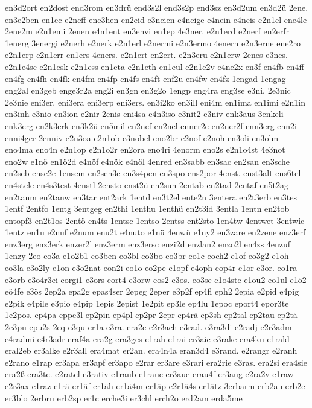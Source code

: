 {en3d2ort
en2dost
end3rom
en3drü
end3s2l
end3s2p
end3sz
en3d2um
en3d2ü
2ene.
en3e2ben
en1ec
e2neff
ene3hen
en2eid
e3neien
e4neige
e4nein
e4neis
e2n1el
ene4le
2ene2m
e2n1emi
2enen
e4n1ent
en3envi
en1ep
4e3ner.
e2n1erd
e2nerf
en2erfr
1energ
3energi
e2nerh
e2nerk
e2n1erl
e2nermi
e2n3ermo
4enern
e2n3erne
ene2ro
e2n1erp
e2n1err
en1ers
4eners.
e2n1ert
en2ert.
e2n3eru
e2n1erw
2enes
e3nes.
e2n1e4sc
e2n1esk
e2n1ess
en1eta
e2n1eth
en1eul
e2n1e2v
e4ne2x
en3f
en4fb
en4ff
en4fg
en4fh
en4fk
en4fm
en4fp
en4fs
en4ft
enf2u
en4fw
en4fz
1engad
1engag
eng2al
en3geb
enge3r2a
eng2i
en3gn
en3g2o
1engp
eng4ra
eng3se
e3ni.
2e3nic
2e3nie
eni3er.
eni3era
eni3erp
eni3ers.
en3i2ko
en3ill
eni4m
en1ima
en1imi
e2n1in
en3inh
e3nio
en3ion
e2nir
2enis
eni4sa
e4n3iso
e3nit2
e3niv
enk3aus
3enkeli
enk3erg
en2k3erk
en3k2ü
en5mil
en2nef
en2nel
enner2e
en2ner2f
enn3erg
enn2i
enni4ger
2enniv
e2n3oa
e2n1ob
e3nobel
eno2br
e2nof
e2noh
en3oli
en3olm
eno4ma
eno4n
e2n1op
e2n1o2r
en2ora
eno4ri
4enorm
eno2s
e2n1o4st
4e3not
eno2w
e1nö
en1ö2d
e4nöf
e4nök
e4nöl
4enred
en3sabb
en3sac
en2san
en3sche
en2seb
ense2e
1ensem
en2sen3e
en3s4pen
en3spo
ens2por
4enst.
enst3alt
ens6tel
en4stele
en4s3test
4enstl
2ensto
enst2ü
en2sun
2entab
en2tad
2entaf
en5t2ag
en2tanm
en2tanw
en3tar
ent2ark
1entd
en3t2el
ente2n
3entera
en2t3erb
en3tes
1entf
2entfo
1entg
3entgeg
en2thi
1enthu
1enthü
en2t3id
3entla
1entn
en2tob
entopf3
en2t1os
2entö
en4ts
1entsc
1entso
2entss
ent2sto
1en4tw
4entwet
3entwic
1entz
en1u
e2nuf
e2num
enu2t
e4nuto
e1nü
4enwü
e1ny2
en3zare
en2zene
enz3erf
enz3erg
enz3erk
enzer2l
enz3erm
enz3ersc
enzi2d
enzlan2
enzo2l
en4zs
4enzuf
1enzy
2eo
eo3a
e1o2b1
eo3ben
eo3bl
eo3bo
eo3br
eo1c
eoch2
e1of
eo3g2
e1oh
eo3la
e3o2ly
e1on
e3o2nat
eon2i
eo1o
eo2pe
e1opf
e4oph
eop4r
e1or
e3or.
eo1ra
e3orb
e3o4r3ei
eorgi1
e3ors
eort4
e3orw
eos2
e3os.
eo3se
e1o4ste
e1ou2
eo1ul
e1ö2
eö4fe
e3ös
2ep2a
epa2g
epas4ser
2epeg
2eper
e3p2f
ep4fl
eph2
2epia
e2pid
e4pig
e2pik
e4pile
e3pio
e4pip
1epis
2epist
1e2pit
ep3le
ep4lu
1epoc
eport4
epor3te
1e2pos.
ep4pa
eppe3l
ep2pin
ep4pl
ep2pr
2epr
ep4rä
ep3sh
ep2tal
ep2tau
ep2tä
2e3pu
epu2s
2eq
e3qu
er1a
e3ra.
era2c
e2r3ach
e3rad.
e3ra3di
e2radj
e2r3adm
e4radmi
e4r3adr
eraf4a
era2g
era3ges
e1rah
e1rai
er3aic
e3rake
era4ku
e1rald
eral2eb
er3alke
e2r3all
era4mat
er2an.
era4n4a
eran3d4
e3rand.
e2rangr
e2ranh
e2rano
e1rap
er3apa
er3apf
er3apo
e2rar
er3are
e3rari
era2rie
e3ras.
era2si
era4sie
era2ß
era3te.
e2ratel
e3rativ
e1raub
e1rauc
er3aue
erau4f
er3aug
e2ra2v
e1raw
e2r3ax
e1raz
e1rä
er1äf
er1äh
er1ä4m
er1äp
e2r1ä4s
er1ätz
3erbarm
erb2au
erb2e
er3blo
2erbru
erb2sp
er1c
erche3i
er3chl
erch2o
erd2am
erda5me
}
